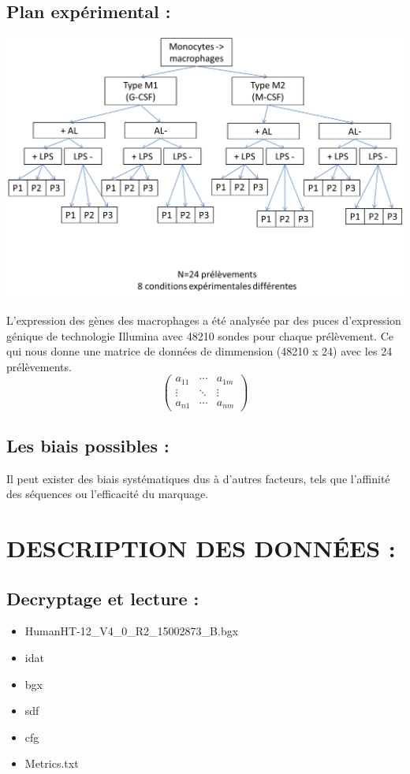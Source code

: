 \documentclass[a4paper,10pt]{article}
\begin{document}
\subsection{ Plan expérimental :}
\begin{center}
 \includegraphics[scale=0.5]{./image/plan.png}
\end{center}
L’expression des gènes des macrophages a été analysée par des puces d’expression génique de technologie Illumina avec 48210 sondes pour chaque prélèvement.
Ce qui nous donne une matrice de données de dimmension (48210 x 24) avec les 24 prélèvements.
\[
\begin{pmatrix}

   a_{11} & \cdots & a_{1m} \\

   \vdots & \ddots &\vdots \\

   a_{n1} & \cdots & a_{nm} 

\end{pmatrix}
\]
\subsection{Les biais possibles :}
 Il peut exister des biais systématiques dus à d'autres facteurs,
  tels que l'affinité des séquences ou l'efficacité du marquage. 
\section{DESCRIPTION DES DONN\'{E}ES :}
\subsection{ Decryptage et lecture :}
\begin{itemize}
 \item HumanHT-12\_V4\_0\_R2\_15002873\_B.bgx
 \item idat
 \item bgx
 \item sdf
 \item cfg
 \item Metrics.txt
\end{itemize}
\end{document}
